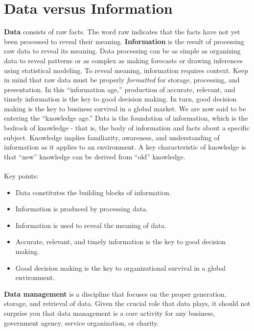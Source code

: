 \documentclass[a4paper, 12pt, titlepage]{report}
\begin{document}
\section{Data versus Information}
\textbf{Data} consists of raw facts. The word raw indicates that the facts have not yet been processed to reveal their meaning.
\textbf{Information} is the result of processing raw data to reveal its meaning. Data processing can be as simple as organizing data to reveal patterns or as complex as making forecasts or drawing inferences using statistical modeling. To reveal meaning, information requires context. Keep in mind that raw data must be properly \emph{formatted} for storage, processing, and presentation.
In this “information age,” production of accurate, relevant, and timely information is the key to good decision making. In turn, good decision making is the key to business survival in a global market. We are now said to be entering the “knowledge age.”
Data is the foundation of information, which is the bedrock of knowledge - that is, the body of information and facts about a specific subject. Knowledge implies familiarity, awareness, and understanding of information as it applies to an environment. A key characteristic of knowledge is that “new” knowledge can be derived from “old” knowledge.
\\ \\ Key points:
\begin{itemize}
\item Data constitutes the building blocks of information.
\item Information is produced by processing data.
\item Information is used to reveal the meaning of data.
\item Accurate, relevant, and timely information is the key to good decision making.
\item Good decision making is the key to organizational survival in a global environment.
\end{itemize}
\textbf{Data management} is a discipline that focuses on the proper generation, storage, and retrieval of data. Given the crucial role that data plays, it should not surprise you that data management is a core activity for any business, government agency, service organization, or charity.
\end{document}
